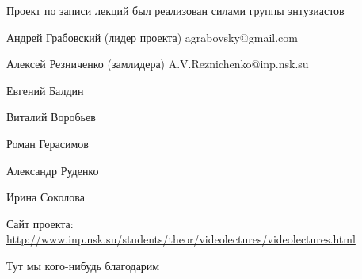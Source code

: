 \documentclass[12pt,pagesize,paper=landscape,paper=192mm:108mm]{scrbook}
\begin{document}
\vspace*{0em}
%

  \begin{center}    
  \vfill

    \begin{minipage}{0.7\linewidth}
      Проект по записи лекций был реализован силами группы энтузиастов
\bigskip

Андрей Грабовский (лидер проекта) agrabovsky@gmail.com

Алексей Резниченко (замлидера) A.V.Reznichenko@inp.nsk.su

Евгений Балдин 

Виталий Воробьев 

Роман Герасимов

Александр Руденко

Ирина Соколова
\bigskip

\begin{flushleft}
  Сайт проекта:
  \url{http://www.inp.nsk.su/students/theor/videolectures/videolectures.html}
\end{flushleft}
    \end{minipage}
    \vfill

  \end{center}
\newpage

\vspace*{0em}
\vfill
\begin{center}
  Тут мы кого-нибудь благодарим
\end{center}
\vfill
\end{document}
